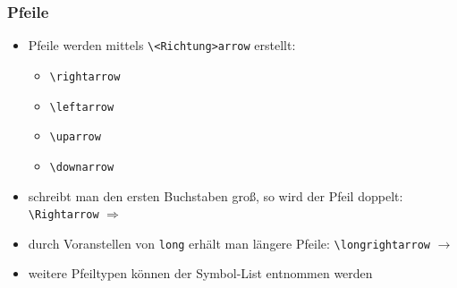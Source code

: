 \begin{frame}[fragile]
\frametitle{Pfeile}
\begin{itemize}
  \item<+-> Pfeile werden mittels \lstinline[style=Latex]+\<Richtung>arrow+ erstellt:
  \begin{itemize}
    \item[$\rightarrow$] \lstinline[style=Latex]+\rightarrow+
    \item[$\leftarrow$] \lstinline[style=Latex]+\leftarrow+
    \item[$\uparrow$] \lstinline[style=Latex]+\uparrow+
    \item[$\downarrow$] \lstinline[style=Latex]+\downarrow+
  \end{itemize}
  \item<+-> schreibt man den ersten Buchstaben groß, so wird der Pfeil doppelt: \\
  \lstinline[style=Latex]+\Rightarrow+ $\Rightarrow$
  \item<+-> durch Voranstellen von \texttt{long} erhält man längere Pfeile:
  \lstinline[style=Latex]+\longrightarrow+ $\longrightarrow$
  \item<+-> weitere Pfeiltypen können der Symbol-List entnommen werden
\end{itemize}
\end{frame}

